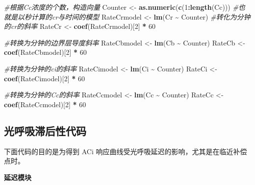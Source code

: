 \documentclass[
]{krantz}
\makeatletter
\newenvironment{Shaded}{\begin{snugshade}}{\end{snugshade}}
\newcommand{\CommentTok}[1]{\textcolor[rgb]{0.56,0.35,0.01}{\textit{#1}}}
\newcommand{\DecValTok}[1]{\textcolor[rgb]{0.00,0.00,0.81}{#1}}
\newcommand{\KeywordTok}[1]{\textcolor[rgb]{0.13,0.29,0.53}{\textbf{#1}}}
\newcommand{\NormalTok}[1]{#1}
\newcommand{\OperatorTok}[1]{\textcolor[rgb]{0.81,0.36,0.00}{\textbf{#1}}}
\newcommand{\StringTok}[1]{\textcolor[rgb]{0.31,0.60,0.02}{#1}}
\newenvironment{kframe}{%
\medskip{}
\setlength{\fboxsep}{.8em}
 \def\at@end@of@kframe{}%
 \ifinner\ifhmode%
  \def\at@end@of@kframe{\end{minipage}}%
  \begin{minipage}{\columnwidth}%
 \fi\fi%
 \def\FrameCommand##1{\hskip\@totalleftmargin \hskip-\fboxsep
 \colorbox{shadecolor}{##1}\hskip-\fboxsep
     \hskip-\linewidth \hskip-\@totalleftmargin \hskip\columnwidth}%
 \MakeFramed {\advance\hsize-\width
   \@totalleftmargin\z@ \linewidth\hsize
   \@setminipage}}%
 {\par\unskip\endMakeFramed%
 \at@end@of@kframe}
\renewenvironment{Shaded}{\begin{kframe}}{\end{kframe}}
\makeatother
\begin{document}
\begin{Shaded}
\begin{Highlighting}[]
\CommentTok{\#根据Cc浓度的个数，构造向量}
\NormalTok{Counter \textless{}{-}}\StringTok{ }\KeywordTok{as.numeric}\NormalTok{(}\KeywordTok{c}\NormalTok{(}\DecValTok{1}\OperatorTok{:}\KeywordTok{length}\NormalTok{(Cc)))}
\CommentTok{\#也就是以秒计算的cr与时间的模型}
\NormalTok{RateCrmodel \textless{}{-}}\StringTok{ }\KeywordTok{lm}\NormalTok{(Cr }\OperatorTok{\textasciitilde{}}\StringTok{ }\NormalTok{Counter)}
\CommentTok{\#转化为分钟的cr的斜率}
\NormalTok{RateCr \textless{}{-}}\StringTok{ }\KeywordTok{coef}\NormalTok{(RateCrmodel)[}\DecValTok{2}\NormalTok{] }\OperatorTok{*}\StringTok{ }\DecValTok{60}

\CommentTok{\#转换为分钟的边界层导度斜率}
\NormalTok{RateCbmodel \textless{}{-}}\StringTok{ }\KeywordTok{lm}\NormalTok{(Cb }\OperatorTok{\textasciitilde{}}\StringTok{ }\NormalTok{Counter)}
\NormalTok{RateCb \textless{}{-}}\StringTok{ }\KeywordTok{coef}\NormalTok{(RateCbmodel)[}\DecValTok{2}\NormalTok{] }\OperatorTok{*}\StringTok{ }\DecValTok{60}

\CommentTok{\#转换为分钟的ci的斜率}
\NormalTok{RateCimodel \textless{}{-}}\StringTok{ }\KeywordTok{lm}\NormalTok{(Ci }\OperatorTok{\textasciitilde{}}\StringTok{ }\NormalTok{Counter)}
\NormalTok{RateCi \textless{}{-}}\StringTok{ }\KeywordTok{coef}\NormalTok{(RateCimodel)[}\DecValTok{2}\NormalTok{] }\OperatorTok{*}\StringTok{ }\DecValTok{60}

\CommentTok{\#转换为分钟的Cc的斜率}
\NormalTok{RateCcmodel \textless{}{-}}\StringTok{ }\KeywordTok{lm}\NormalTok{(Cc }\OperatorTok{\textasciitilde{}}\StringTok{ }\NormalTok{Counter)}
\NormalTok{RateCc \textless{}{-}}\StringTok{ }\KeywordTok{coef}\NormalTok{(RateCcmodel)[}\DecValTok{2}\NormalTok{] }\OperatorTok{*}\StringTok{ }\DecValTok{60} 
\end{Highlighting}
\end{Shaded}

\hypertarget{code-photoresp}{%
\subsection{光呼吸滞后性代码}\label{code-photoresp}}

下面代码的目的是为得到 ACi 响应曲线受光呼吸延迟的影响，尤其是在临近补偿点时。

\textbf{延迟模块}
\end{document}
